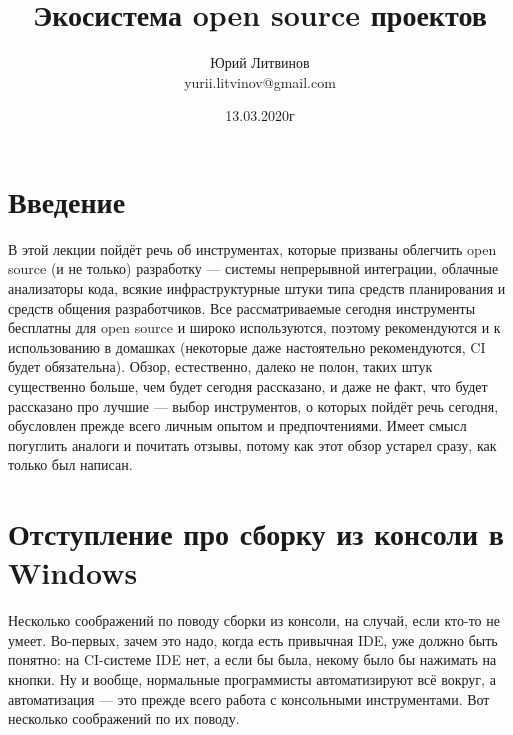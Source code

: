 \documentclass[a5paper]{article}
\title{Экосистема open source проектов}
\author{Юрий Литвинов\\\small{yurii.litvinov@gmail.com}}
\date{13.03.2020г}
\begin{document}
\maketitle
\thispagestyle{empty}

\section{Введение}

В этой лекции пойдёт речь об инструментах, которые призваны облегчить open source (и не только) разработку --- системы непрерывной интеграции, облачные анализаторы кода, всякие инфраструктурные штуки типа средств планирования и средств общения разработчиков. Все рассматриваемые сегодня инструменты бесплатны для open source и широко используются, поэтому рекомендуются и к использованию в домашках (некоторые даже настоятельно рекомендуются, CI будет обязательна). Обзор, естественно, далеко не полон, таких штук существенно больше, чем будет сегодня рассказано, и даже не факт, что будет рассказано про лучшие --- выбор инструментов, о которых пойдёт речь сегодня, обусловлен прежде всего личным опытом и предпочтениями. Имеет смысл погуглить аналоги и почитать отзывы, потому как этот обзор устарел сразу, как только был написан.

\section{Отступление про сборку из консоли в Windows}

Несколько соображений по поводу сборки из консоли, на случай, если кто-то не умеет. Во-первых, зачем это надо, когда есть привычная IDE, уже должно быть понятно: на CI-системе IDE нет, а если бы была, некому было бы нажимать на кнопки. Ну и вообще, нормальные программисты автоматизируют всё вокруг, а автоматизация --- это прежде всего работа с консольными инструментами. Вот несколько соображений по их поводу.
\end{document}

